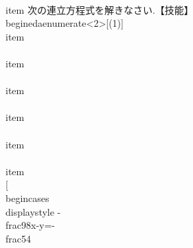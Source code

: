  \\item 次の連立方程式を解きなさい.【技能】
       \\begin{edaenumerate}<2>[(1)]
	\\item \\[
		\\begin{cases}
		 -6x+y=-7\\\\
		 -10x-y=-9
		\\end{cases}
	       \\]
	 \\item \\[
		\\begin{cases}
		 x-2y=-7\\\\
		 -8y+3=x
		\\end{cases}
	       \\]
	 \\item \\[
		\\begin{cases}
		 -2x+4y=-2\\\\
		 7x-3y=10
		\\end{cases}
	       \\]
	 \\item \\[
		\\begin{cases}
		 -6x-4y=17\\\\
		 3x+4y=-18
		\\end{cases}
	       \\]
	 \\item \\[
		\\begin{cases}
		 \\displaystyle \\frac{7}{8}x-\\frac{3}{8}y=2\\\\
		 \\displaystyle \\frac{1}{8}x-\\frac{1}{4}y=\\frac{9}{4}
		\\end{cases}
	       \\]
	 \\item \\[
		\\begin{cases}
		 \\displaystyle -\\frac{9}{8}x-y=-\\frac{5}{4}\\\\
